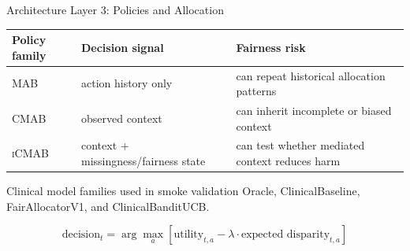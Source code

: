 \documentclass[aspectratio=169,10pt]{beamer}
\newcommand{\mab}{\textsc{MAB}}
\newcommand{\cmab}{\textsc{CMAB}}
\newcommand{\icmab}{\textsc{iCMAB}}
\begin{document}
\begin{frame}{Architecture Layer 3: Policies and Allocation}
\begin{center}
\begin{tabular}{p{}p{}p{}}
\toprule
Policy family & Decision signal & Fairness risk \\
\midrule
\mab & action history only & can repeat historical allocation patterns \\
\cmab & observed context & can inherit incomplete or biased context \\
\icmab & context + missingness/fairness state & can test whether mediated context reduces harm \\
\bottomrule
\end{tabular}
\end{center}

\vspace{0.6em}
\begin{block}{Clinical model families used in smoke validation}
Oracle, ClinicalBaseline, FairAllocatorV1, and ClinicalBanditUCB.
\end{block}

\begin{equation*}
\text{decision}_t = \arg\max_a \left[\text{utility}_{t,a} - \lambda \cdot \text{expected disparity}_{t,a}\right]
\end{equation*}
\end{frame}
\end{document}

